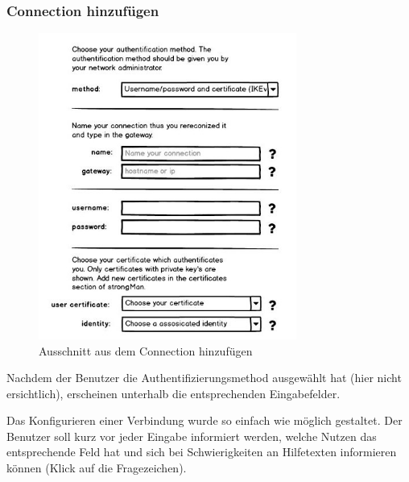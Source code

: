 \subsubsection{Connection hinzufügen}
\noindent\begin{minipage}[t]{0.55\textwidth}
\vspace{0pt}
    \begin{figure}[H]
    	\centering
    	\includegraphics[width=240pt]{images/mockups/short_con_config.jpg}
    	\caption{Ausschnitt aus dem Connection hinzufügen}
    \end{figure}
\end{minipage}
\hfill
\begin{minipage}[t]{0.45\textwidth}
\vspace{0pt}
Nachdem der Benutzer die Authentifizierungsmethod ausgewählt hat (hier nicht ersichtlich), erscheinen unterhalb die entsprechenden Eingabefelder.

Das Konfigurieren einer Verbindung wurde so einfach wie möglich gestaltet. Der Benutzer soll kurz vor jeder Eingabe informiert werden, welche Nutzen das entsprechende Feld hat und sich bei Schwierigkeiten an Hilfetexten informieren können (Klick auf die Fragezeichen).
\end{minipage}